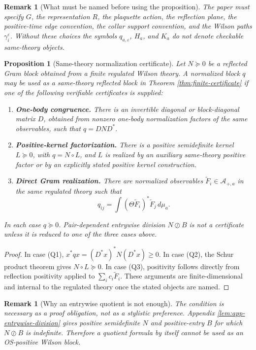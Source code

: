 \documentclass[11pt]{article}
\newtheorem{proposition}[theorem]{Proposition}
\newtheorem{remark}[theorem]{Remark}
\newcommand{\eps}{\varepsilon}
\newcommand{\Had}{\circ}
\newcommand{\odiv}{\oslash}
\begin{document}
\begin{remark}[What must be named before using the proposition]
The paper must specify \(G\), the representation \(R\), the plaquette action, the reflection plane, the positive-time edge convention, the collar support convention, and the Wilson paths \(\gamma_i^\eps\).  Without these choices the symbols \(q_{a,\eps}\), \(H_a\), and \(K_a\) do not denote checkable same-theory objects.
\end{remark}

\begin{proposition}[Same-theory normalization certificate]
\label{prop:same-theory-normalization}
Let \(N\succeq0\) be a reflected Gram block obtained from a finite regulated Wilson theory.  A normalized block \(q\) may be used as a same-theory reflected block in Theorem \ref{thm:finite-certificate} if one of the following verifiable certificates is supplied:
\begin{enumerate}[label=(Q\arabic*)]
  \item \textbf{One-body congruence.}  There is an invertible diagonal or block-diagonal matrix \(D\), obtained from nonzero one-body normalization factors of the same observables, such that \(q=DND^*\).
  \item \textbf{Positive-kernel factorization.}  There is a positive semidefinite kernel \(L\succeq0\), with \(q=N\Had L\), and \(L\) is realized by an auxiliary same-theory positive factor or by an explicitly stated positive kernel construction.
  \item \textbf{Direct Gram realization.}  There are normalized observables \(\widetilde F_i\in\mathcal A_{+,a}\) in the same regulated theory such that
  \[
    q_{ij}=\int(\Theta\widetilde F_i)^*\widetilde F_j\,d\mu_a .
  \]
\end{enumerate}
In each case \(q\succeq0\).  Pair-dependent entrywise division \(N\odiv B\) is not a certificate unless it is reduced to one of the three cases above.
\end{proposition}

\begin{proof}
In case (Q1), \(x^*q x=(D^*x)^*N(D^*x)\ge0\).  In case (Q2), the Schur product theorem gives \(N\Had L\succeq0\).  In case (Q3), positivity follows directly from reflection positivity applied to \( \sum_i c_i\widetilde F_i\).  These arguments are finite-dimensional and internal to the regulated theory once the stated objects are named.
\end{proof}

\begin{remark}[Why an entrywise quotient is not enough]
The condition is necessary as a proof obligation, not as a stylistic preference.  Appendix \ref{lem:app-entrywise-division} gives positive semidefinite \(N\) and positive-entry \(B\) for which \(N\odiv B\) is indefinite.  Therefore a quotient formula by itself cannot be used as an OS-positive Wilson block.
\end{remark}
\end{document}
